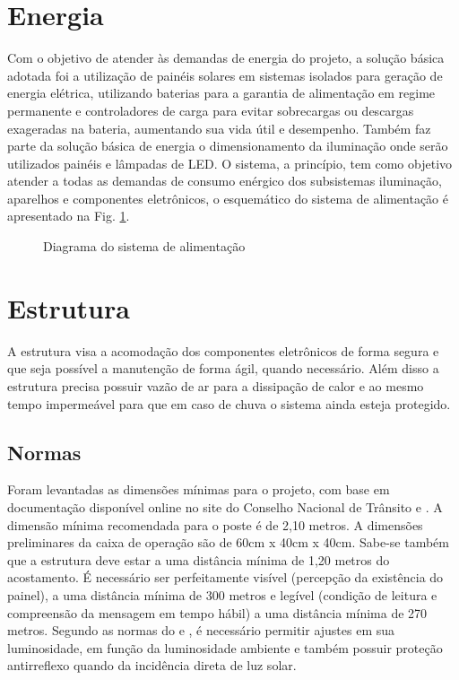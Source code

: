 \section{Energia}

Com o objetivo de atender às demandas de energia do projeto, a solução básica adotada foi a utilização de painéis solares em sistemas isolados para geração de energia elétrica, utilizando baterias para a garantia de alimentação em regime permanente e controladores de carga para evitar sobrecargas ou descargas exageradas na bateria, aumentando sua vida útil e desempenho. Também faz parte da solução básica de energia o dimensionamento da iluminação onde serão utilizados painéis e lâmpadas de LED. O sistema, a princípio, tem como objetivo atender a todas as demandas de consumo enérgico dos subsistemas iluminação, aparelhos e componentes eletrônicos, o esquemático do sistema de alimentação é apresentado na Fig. \ref{fig:diagrama_energia}.

\begin{figure}[!htb]
	\caption{\label{fig:diagrama_energia} Diagrama do sistema de alimentação}
\end{figure}

\section{Estrutura}

A estrutura visa a acomodação dos componentes eletrônicos de forma segura e que seja possível a manutenção de forma ágil, quando necessário. Além disso a estrutura precisa possuir vazão de ar para a dissipação de calor e ao mesmo tempo impermeável para que em caso de chuva o sistema ainda esteja protegido.

\subsection{Normas}

Foram levantadas as dimensões mínimas para o projeto, com base em documentação disponível online no site do Conselho Nacional de Trânsito \cite{contranV} e \cite{contranVI}. A dimensão mínima recomendada para o poste é de 2,10 metros. A dimensões preliminares da caixa de operação são de 60cm x 40cm x 40cm. Sabe-se também que a estrutura deve estar a uma distância mínima de 1,20 metros do acostamento. É necessário ser perfeitamente visível (percepção da existência do painel), a uma distância mínima de 300 metros e legível (condição de leitura e compreensão da mensagem em tempo hábil) a uma distância mínima de 270 metros. Segundo as normas do \cite{contranV} e \cite{contranVI}, é necessário permitir ajustes em sua
luminosidade, em função da luminosidade ambiente e também possuir proteção antirreflexo quando da incidência direta de luz solar.


